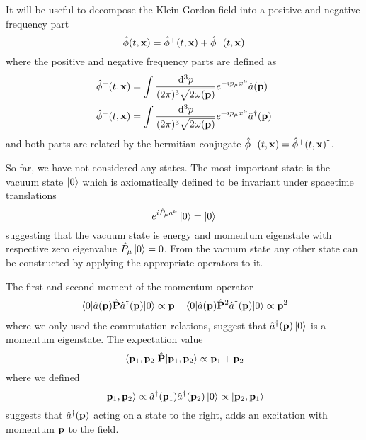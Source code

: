 It will be useful to decompose the Klein-Gordon field into a positive and negative frequency part
\begin{equation}
	\hat\phi(t,\vb{x})
	=
	\hat\phi^+(t,\vb{x})
	+
	\hat\phi^+(t,\vb{x})
\end{equation}
where the positive and negative frequency parts are defined as~\cite[p.~26]{Peskin1995}
\begin{align}
	\hat\phi^+(t,\vb{x})
	&=
	\int\frac{\dd[3]{p}}{(2\pi)^3\sqrt{2\omega(\vb{p})}}
	e^{-ip_\mu x^\mu}
	\hat{a}(\vb{p})
	\\
	\hat\phi^-(t,\vb{x})
	&=
	\int\frac{\dd[3]{p}}{(2\pi)^3\sqrt{2\omega(\vb{p})}}
	e^{+ip_\mu x^\mu}
	\hat{a}^\dagger(\vb{p})
\end{align}
and both parts are related by the hermitian conjugate $\hat\phi^-(t,\vb{x})=\hat\phi^+(t,\vb{x})^\dagger$.

So far, we have not considered any states.
The most important state is the vacuum state $\ket{0}$ which is axiomatically defined to be invariant under spacetime translations~\cite[p.~276]{Bogolubov1989}
\begin{equation}
	e^{i\hat{P}_\mu a^\mu}
	\ket{0}
	=
	\ket{0}
\end{equation}
suggesting that the vacuum state is energy and momentum eigenstate with respective zero eigenvalue $\hat{P}_\mu\ket{0}=0$.
From the vacuum state any other state can be constructed by applying the appropriate operators to it.

The first and second moment of the momentum operator
\begin{align}
	\expval{\hat{a}(\vb{p})\hat{\vb{P}}\hat{a}^\dagger(\vb{p})}{0}
	\propto
	\vb{p}
	&&
	\expval{\hat{a}(\vb{p})\hat{\vb{P}}^2\hat{a}^\dagger(\vb{p})}{0}
	\propto
	\vb{p}^2
\end{align}
where we only used the commutation relations, suggest that $\hat{a}^\dagger(\vb{p})\ket{0}$ is a momentum eigenstate.
The expectation value
\begin{equation}
	\expval{\hat{\vb{P}}}{\vb{p}_1,\vb{p}_2}
	\propto
	\vb{p}_1+\vb{p}_2
\end{equation}
where we defined
\begin{equation}
	\ket{\vb{p}_1,\vb{p}_2}
	\propto
	\hat{a}^\dagger(\vb{p}_1)
	\hat{a}^\dagger(\vb{p}_2)
	\ket{0}
	\propto
	\ket{\vb{p}_2,\vb{p}_1}
\end{equation}
suggests that $\hat{a}^\dagger(\vb{p})$ acting on a state to the right, adds an excitation with momentum $\vb{p}$ to the field.

